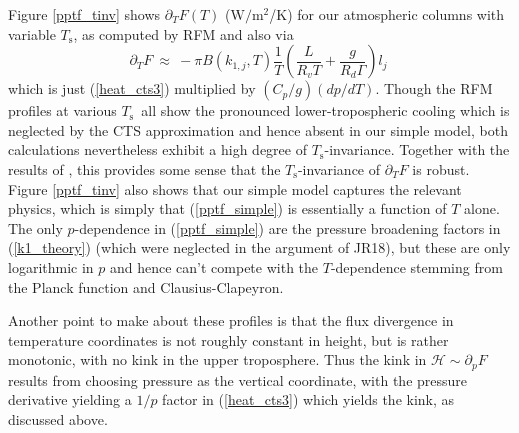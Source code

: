 \documentclass{ametsoc}
\newcommand{\beqn}{\begin{equation}}
\newcommand{\eeqn}{\end{equation}}
\newcommand{\eqnref}[1]{(\ref{#1})}
\newcommand{\Wmsq}{\ensuremath{\mathrm{W/m^2}}}
\newcommand{\ppt}{\ensuremath{\partial_T}}
\newcommand{\ppp}{\ensuremath{\partial_p}}
\newcommand{\Rd}{\ensuremath{R_d}}
\newcommand{\Rv}{\ensuremath{R_v}}
\newcommand{\Ts}{\ensuremath{T_\mathrm{s}}}
\newcommand{\ch}{\ensuremath{\mathcal{H}}}
\newcommand{\lj}{\ensuremath{l_j}}
\newcommand{\konej}{\ensuremath{k_{1,j}}}
\begin{document}
Figure \ref{pptf_tinv} shows $\ppt F(T)$ (\Wmsq/K) for our atmospheric columns with variable \Ts, as computed by RFM and also via 
\beqn
		\ppt F  \ \approx \ - \pi B(\konej,T)\frac{1}{T}\left(\frac{L}{\Rv T}+\frac{g}{\Rd\Gamma}\right) \lj \ 
	\label{pptf_simple}
\eeqn
which is just \eqnref{heat_cts3} multiplied by $(C_p/g)(dp/dT)$. Though the RFM profiles at various \Ts\ all show the pronounced lower-tropospheric cooling which is neglected by the CTS approximation and hence absent in our simple model, both calculations nevertheless exhibit a high degree of  \Ts-invariance. Together with the results of \cite{cronin2017}, this provides some sense that the \Ts-invariance of $\ppt F$ is robust. Figure \ref{pptf_tinv}  also shows that our simple model captures the relevant physics, which is simply that \eqnref{pptf_simple} is essentially  a function of $T$ alone. The only $p$-dependence in \eqnref{pptf_simple} are the pressure broadening factors in \eqnref{k1_theory} (which were neglected in the argument of JR18), but these  are only logarithmic in $p$ and hence can't compete with the  $T$-dependence stemming from the Planck function and Clausius-Clapeyron.
 
  Another point to make about these profiles is that the flux divergence in temperature coordinates is not roughly constant in height, but is rather monotonic, with no kink in the upper troposphere. Thus the kink in $\ch\sim \ppp F$  results from choosing pressure as the vertical coordinate, with the pressure derivative yielding a $1/p$ factor in \eqnref{heat_cts3} which yields the kink, as discussed above.
 
 
\end{document}
